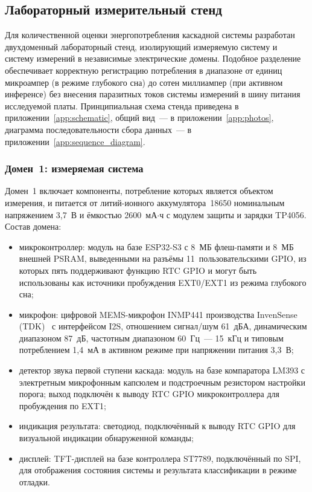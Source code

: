 \subsection{Лабораторный измерительный стенд}

Для количественной оценки энергопотребления каскадной системы
разработан двухдоменный лабораторный стенд, изолирующий
измеряемую систему и систему измерений в независимые
электрические домены. Подобное разделение обеспечивает
корректную регистрацию потребления в диапазоне от единиц
микроампер (в режиме глубокого сна) до сотен миллиампер (при
активном инференсе) без внесения паразитных токов системы
измерений в шину питания исследуемой платы. Принципиальная схема
стенда приведена в приложении~\ref{app:schematic}, общий
вид~--- в приложении~\ref{app:photos}, диаграмма
последовательности сбора данных~--- в
приложении~\ref{app:sequence_diagram}.

\subsubsection{Домен~1: измеряемая система}

Домен~1 включает компоненты, потребление которых является
объектом измерения, и питается от литий-ионного
аккумулятора~18650 номинальным напряжением 3,7~В и ёмкостью
2600~мА$\cdot$ч с модулем защиты и зарядки TP4056. Состав
домена:

\begin{itemize}
	\item микроконтроллер: модуль на базе ESP32-S3 с 8~МБ
	      флеш-памяти и 8~МБ внешней PSRAM, выведенными на разъёмы
	      11~пользовательскими GPIO, из которых пять поддерживают
	      функцию RTC GPIO и могут быть использованы как
	      источники пробуждения EXT0/EXT1 из режима глубокого
	      сна;
	\item микрофон: цифровой MEMS-микрофон INMP441 производства
	      InvenSense (TDK)~\cite{src:15} с интерфейсом I2S,
	      отношением сигнал/шум 61~дБА, динамическим диапазоном
	      87~дБ, частотным диапазоном 60~Гц~--- 15~кГц и типовым
	      потреблением 1,4~мА в активном режиме при напряжении
	      питания 3,3~В;
	\item детектор звука первой ступени каскада: модуль на базе
	      компаратора LM393 с электретным микрофонным капсюлем и
	      подстроечным резистором настройки порога; выход
	      подключён к выводу RTC GPIO микроконтроллера для
	      пробуждения по EXT1;
	\item индикация результата: светодиод, подключённый к
	      выводу RTC GPIO для визуальной индикации обнаруженной
	      команды;
	\item дисплей: TFT-дисплей на базе контроллера ST7789,
	      подключённый по SPI, для отображения состояния системы
	      и результата классификации в режиме отладки.
\end{itemize}

